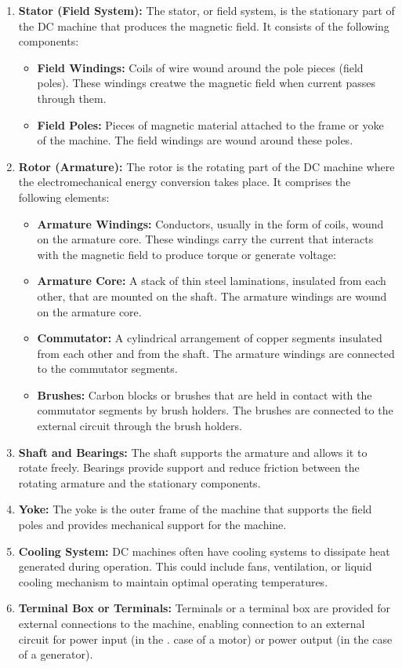 \documentclass[12pt]{article}
\begin{document}
\begin{enumerate}
    \item \textbf{Stator (Field System): } The stator, or field system, is the stationary part of the DC machine that produces the magnetic field. It consists of the following components:
        \begin{itemize}
            \item \textbf{Field Windings: } Coils of wire wound around the pole pieces (field poles). These windings creatwe the magnetic field when current passes through them.\item \textbf{Field Poles: } Pieces of magnetic material attached to the frame or yoke of the machine. The field windings are wound around these poles.
        \end{itemize}
    \item \textbf{Rotor (Armature): } The rotor is the rotating part of the DC machine where the electromechanical energy conversion takes place. It comprises the following elements:
        \begin{itemize}
            \item \textbf{Armature Windings: } Conductors, usually in the form of coils, wound on the armature core. These windings carry the current that interacts with the magnetic field to produce torque or generate voltage:
            \item \textbf{Armature Core: } A stack of thin steel laminations, insulated from each other, that are mounted on the shaft. The armature windings are wound on the armature core.
            \item \textbf{Commutator: } A cylindrical arrangement of copper segments insulated from each other and from the shaft. The armature windings are connected to the commutator segments.
            \item \textbf{Brushes: } Carbon blocks or brushes that are held in contact with the commutator segments by brush holders. The brushes are connected to the external circuit through the brush holders.
        \end{itemize}
    \item \textbf{Shaft and Bearings: } The shaft supports the armature and allows it to rotate freely. Bearings provide support and reduce friction between the rotating armature and the stationary components.    
    \item \textbf{Yoke: } The yoke is the outer frame of the machine that supports the field poles and provides mechanical support for the machine.
    \item \textbf{Cooling System: } DC machines often have cooling systems to dissipate heat generated during operation. This could include fans, ventilation, or liquid cooling mechanism to maintain optimal operating temperatures.
    \item \textbf{Terminal Box or Terminals: } Terminals or a terminal box are provided for external connections to the machine, enabling connection to an external circuit for power input (in the . case of a motor) or power output (in the case of a generator).
\end{enumerate}
\end{document}
